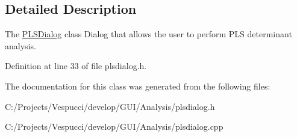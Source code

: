 \subsection{Detailed Description}
The \hyperlink{class_p_l_s_dialog}{P\+L\+S\+Dialog} class Dialog that allows the user to perform P\+L\+S determinant analysis. 

Definition at line 33 of file plsdialog.\+h.



The documentation for this class was generated from the following files\+:\begin{DoxyCompactItemize}
\item 
C\+:/\+Projects/\+Vespucci/develop/\+G\+U\+I/\+Analysis/plsdialog.\+h\item 
C\+:/\+Projects/\+Vespucci/develop/\+G\+U\+I/\+Analysis/plsdialog.\+cpp\end{DoxyCompactItemize}
